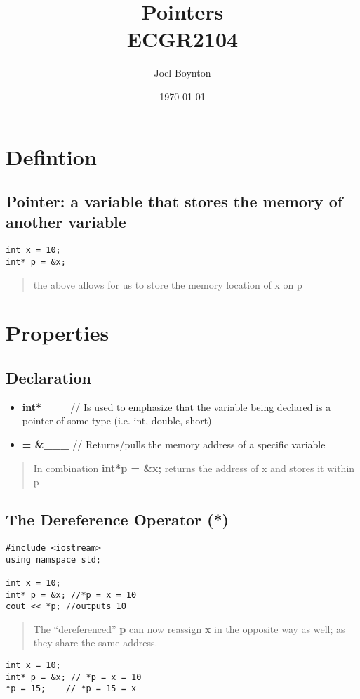 \documentclass[11pt]{article}
\author{Joel Boynton}
\date{\today}
\title{Pointers\\\medskip
\large ECGR2104}
\begin{document}
\maketitle
\clearpage
\section{Defintion}
\label{sec:org2b461c6}
\subsection{\textbf{Pointer:} a variable that stores the memory of another variable}
\label{sec:org9438f98}
\begin{verbatim}
int x = 10;
int* p = &x;
\end{verbatim}
\begin{quote}
the above allows for us to store the memory location of x on p
\end{quote}
\section{Properties}
\label{sec:org4f2b94f}
\subsection{\textbf{Declaration}}
\label{sec:org0cd20ff}

\begin{itemize}
\item \textbf{int*\_\_\_}     // Is used to emphasize that the variable being declared is a pointer of some type (i.e. int, double, short)

\item \textbf{= \&\_\_\_}   // Returns/pulls the memory address of a specific variable
\end{itemize}

\begin{quote}
In combination \textbf{int*p = \&x;} returns the address of x and stores it within p
\end{quote}
\subsection{\textbf{The Dereference Operator} (*)}
\label{sec:orgfb8ec39}
\begin{verbatim}
#include <iostream>
using namspace std;

int x = 10;
int* p = &x; //*p = x = 10
cout << *p; //outputs 10
\end{verbatim}
\begin{quote}
The ``dereferenced'' \textbf{p} can now reassign \textbf{x} in the opposite way as well; as they share the same address.
\end{quote}
\begin{verbatim}
int x = 10;
int* p = &x; // *p = x = 10
*p = 15;    // *p = 15 = x
\end{verbatim}
\end{document}
